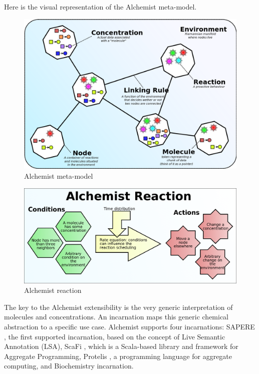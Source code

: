 \documentclass[12pt,a4paper,openright,twoside]{book}
\begin{document}
Here is the visual representation of the Alchemist meta-model.

\begin{figure}[h]
  \centering
  \includegraphics[width=\textwidth]{figures/alchemist-model.png}
  \caption{Alchemist meta-model}
\end{figure}

\begin{figure}[h]
  \centering
  \includegraphics[width=\textwidth]{figures/alchemist-reaction.png}
  \caption{Alchemist reaction}
\end{figure}

The key to the Alchemist extensibility is the very generic interpretation of molecules and concentrations. An incarnation maps this generic chemical abstraction to a specific use case.
Alchemist supports four incarnations:
SAPERE \cite{DBLP:conf/saso/CastelliMRZ11}, the first supported incarnation, based on the concept of Live Semantic Annotation (LSA),
ScaFi \cite{DBLP:journals/softx/CasadeiVAP22}, which is a Scala-based library and framework for Aggregate Programming,
Protelis \cite{DBLP:conf/sac/PianiniVB15}, a programming language for aggregate computing, and
Biochemistry incarnation.
\end{document}
